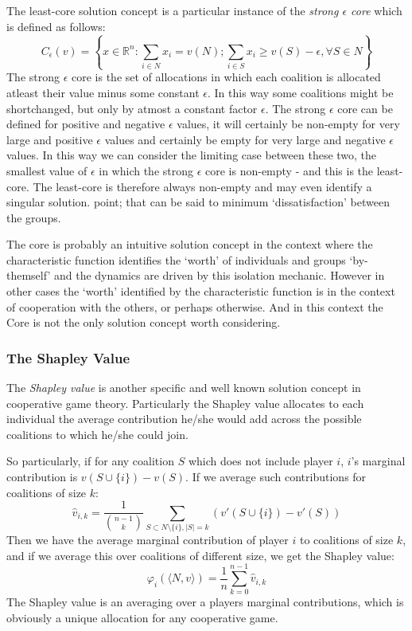 The least-core solution concept is a particular instance of the \textit{strong $\epsilon$ core} which is defined as follows:
$$ C_\epsilon(v) = \left\{x\in\mathbb{R}^n : \sum_{i\in N}x_i=v(N); \sum_{i\in S}x_i \ge v(S)-\epsilon, \forall S\in N \right\}$$
The strong $\epsilon$ core is the set of allocations in which each coalition is allocated atleast their value minus some constant $\epsilon$.
In this way some coalitions might be shortchanged, but only by atmost a constant factor $\epsilon$.
The strong $\epsilon$ core can be defined for positive and negative $\epsilon$ values, it will certainly be non-empty for very large and positive $\epsilon$ values and certainly be empty for very large and negative $\epsilon$ values.
In this way we can consider the limiting case between these two, the smallest value of $\epsilon$ in which the strong $\epsilon$ core is non-empty - and this is the least-core.\cite{doi:10.1287/moor.4.4.303}
The least-core is therefore always non-empty and may even identify a singular solution. point; that can be said to minimum `dissatisfaction' between the groups.

The core is probably an intuitive solution concept in the context where the characteristic function identifies the `worth' of individuals and groups `by-themself' and the dynamics are driven by this isolation mechanic.
However in other cases the `worth' identified by the characteristic function is in the context of cooperation with the others, or perhaps otherwise.
And in this context the Core is not the only solution concept worth considering.

\subsubsection{The Shapley Value}

The \textit{Shapley value} is another specific and well known solution concept in cooperative game theory.
Particularly the Shapley value allocates to each individual the average contribution he/she would add across the possible coalitions to which he/she could join.

So particularly, if for any coalition $S$ which does not include player $i$, $i$'s marginal contribution is $v(S\cup\{i\}) - v(S)$. If we average such contributions for coalitions of size $k$:
\begin{equation}\label{eq:shapley_value2}
\hat{v}_{i,k} = \frac{1}{\binom{n-1}{k}}\sum_{S\subset N\setminus \{ i\} , |S|=k} %
(v'(S\cup\{i\})-v'(S))
\end{equation}
Then we have the average marginal contribution of player $i$ to coalitions of size $k$, and if we average this over coalitions of different size, we get the Shapley value:
\begin{equation}\label{shap2} \varphi_i(\langle N,v\rangle) = \frac{1}{n}\sum_{k=0}^{n-1}\hat{v}_{i,k} \end{equation}
The Shapley value is an averaging over a players marginal contributions, which is obviously a unique allocation for any cooperative game.

